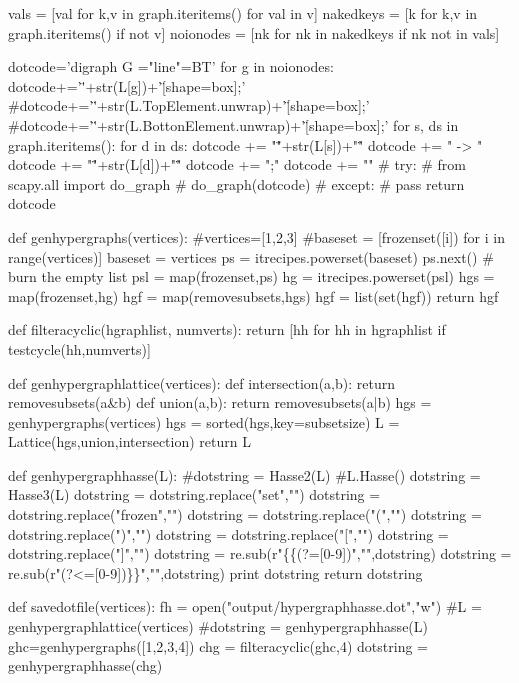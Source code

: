 \begin{python}
        vals = [val for k,v in graph.iteritems() for val in v]
        nakedkeys = [k for k,v in graph.iteritems() if not v]
        noionodes = [nk for nk in nakedkeys if nk not in vals]

        dotcode='digraph G {\nsplines="line"\nrankdir=BT\n'
        for g in noionodes:
            dotcode+='\"'+str(L[g])+'\" [shape=box];\n'
        #dotcode+='\"'+str(L.TopElement.unwrap)+'\" [shape=box];\n'
        #dotcode+='\"'+str(L.BottonElement.unwrap)+'\" [shape=box];\n'
        for s, ds in graph.iteritems():
            for d in ds:
                dotcode += "\""+str(L[s])+"\""
                dotcode += " -> "
                dotcode += "\""+str(L[d])+"\""
                dotcode += ";\n"
        dotcode += "}"
        # try:
        #     from scapy.all import do_graph
        #     do_graph(dotcode)
        # except:
        #     pass
        return dotcode

def genhypergraphs(vertices):
    #vertices=[1,2,3]
    #baseset = [frozenset([i]) for i in range(vertices)]
    baseset = vertices
    ps = itrecipes.powerset(baseset)
    ps.next() # burn the empty list
    psl = map(frozenset,ps)
    hg = itrecipes.powerset(psl)
    hgs = map(frozenset,hg)
    hgf = map(removesubsets,hgs)
    hgf = list(set(hgf))
    return hgf

def filteracyclic(hgraphlist, numverts):
    return [hh for hh in hgraphlist if testcycle(hh,numverts)]

def genhypergraphlattice(vertices):
    def intersection(a,b): return removesubsets(a&b)
    def union(a,b): return removesubsets(a|b)
    hgs = genhypergraphs(vertices)
    hgs = sorted(hgs,key=subsetsize)
    L = Lattice(hgs,union,intersection)
    return L

def genhypergraphhasse(L):
    #dotstring = Hasse2(L) #L.Hasse()
    dotstring = Hasse3(L)
    dotstring = dotstring.replace("set","")
    dotstring = dotstring.replace("frozen","")
    dotstring = dotstring.replace("(","")
    dotstring = dotstring.replace(")","")
    dotstring = dotstring.replace("[","{")
    dotstring = dotstring.replace("]","}")
    dotstring = re.sub(r"\{\{(?=[0-9])","{",dotstring)
    dotstring = re.sub(r"(?<=[0-9])\}\}","}",dotstring)
    print dotstring
    return dotstring

def savedotfile(vertices):
    fh = open("output/hypergraphhasse.dot","w")
    #L = genhypergraphlattice(vertices)
    #dotstring = genhypergraphhasse(L)
    ghc=genhypergraphs([1,2,3,4])
    chg = filteracyclic(ghc,4)
    dotstring = genhypergraphhasse(chg)


\end{python}
